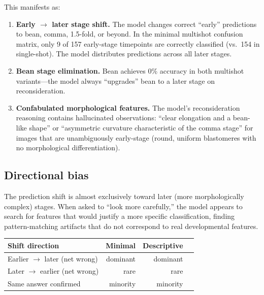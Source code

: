\documentclass[11pt, a4paper]{article}
\begin{document}
This manifests as:

\begin{enumerate}[nosep]
  \item \textbf{Early $\to$ later stage shift.}  The model changes correct
    ``early'' predictions to bean, comma, 1.5-fold, or beyond.  In the minimal
    multishot confusion matrix, only 9 of 157 early-stage timepoints are
    correctly classified (vs.\ 154 in single-shot).  The model distributes
    predictions across all later stages.

  \item \textbf{Bean stage elimination.}  Bean achieves 0\% accuracy in both
    multishot variants---the model always ``upgrades'' bean to a later stage on
    reconsideration.

  \item \textbf{Confabulated morphological features.}  The model's reconsideration
    reasoning contains hallucinated observations: ``clear elongation and a
    bean-like shape'' or ``asymmetric curvature characteristic of the comma
    stage'' for images that are unambiguously early-stage (round, uniform
    blastomeres with no morphological differentiation).
\end{enumerate}

\subsection{Directional bias}

The prediction shift is almost exclusively toward later (more morphologically
complex) stages.  When asked to ``look more carefully,'' the model appears to
search for features that would justify a more specific classification, finding
pattern-matching artifacts that do not correspond to real developmental features.

\begin{center}
\small
\begin{tabular}{@{}lrrr@{}}
\toprule
\textbf{Shift direction} & \textbf{Minimal} & \textbf{Descriptive} \\
\midrule
Earlier $\to$ later (net wrong)     & dominant & dominant \\
Later $\to$ earlier (net wrong)     & rare     & rare \\
Same answer confirmed               & minority & minority \\
\bottomrule
\end{tabular}
\end{center}
\end{document}
